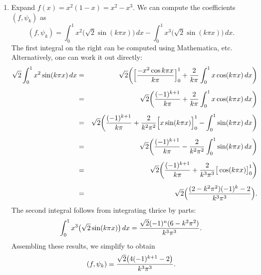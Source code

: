 
\begin{solution}
\begin{enumerate}
  \item Expand $f(x) = x^2(1-x) = x^2-x^3$.  We can compute the coefficients
        $(f,\psi_k)$ as
            \[ (f,\psi_k) = \int_0^1 x^2 \big(\sqrt{2}\sin(k\pi x)\big)\, dx
                          - \int_0^1 x^3 \big(\sqrt{2}\sin(k\pi x)\big)\, dx.\]
        The first integral on the right can be computed using Mathematica, etc.
        Alternatively, one can work it out directly:
         \begin{eqnarray*}
              \sqrt{2} \int_0^1 x^2 \sin(k\pi x)\,dx
                         &=& \sqrt{2}\bigg(\Big[{-x^2 \cos{k\pi x} \over k\pi}\Big]_0^1
                                 + {2\over k\pi} \int_0^1 x\cos(k\pi x)\, dx\bigg) \\[0.5em]
                         &=& \sqrt{2}\bigg({(-1)^{k+1} \over k\pi}
                                 + {2\over k\pi} \int_0^1 x \cos(k\pi x)\, dx\bigg) \\[0.5em]
                         &=& \sqrt{2}\bigg({(-1)^{k+1} \over k\pi}
                        + {2\over k^2\pi^2} \Big[x\sin(k\pi x)\Big]_0^1
                                 - \int_0^1 \sin(k\pi x)\, dx\bigg) \\[0.5em]
                         &=& \sqrt{2}\bigg({(-1)^{k+1} \over k\pi}
                        - {2\over k^2\pi^2} \int_0^1 \sin(k\pi x)\, dx\bigg) \\[0.5em]
                         &=& \sqrt{2}\bigg({(-1)^{k+1} \over k\pi}
                        + {2\over k^3\pi^3}  \big[\cos(k\pi x)\big]_0^1\bigg) \\[0.5em]
                         &=& \sqrt{2}\Big({(2-k^2\pi^2)(-1)^k - 2 \over k^3 \pi^3}\Big).
         \end{eqnarray*}
        The second integral follows from integrating thrice by parts:
             \[ \int_0^1 x^3 \big(\sqrt{2}\sin(k\pi x)\big)\, dx
                  = {\sqrt{2}(-1)^n (6-k^2 \pi^2) \over k^3 \pi^3}.\]
        Assembling these results, we simplify to obtain
           \[ (f,\psi_k) = {\sqrt{2} \big(4(-1)^{k+1}-2\big) \over k^3\pi^3}.\]


\end{enumerate}
\end{solution}
